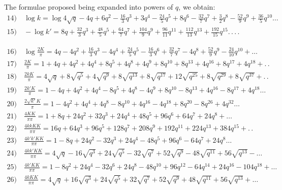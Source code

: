 \documentclass{article}
\begin{document}
The formulae proposed being expanded into powers of $q$, we obtain:
\[
\begin{gathered}
\text{14)}\quad\log k=\log4\sqrt{q}-4q+6q^{2}-\frac{16}{3}q^{3}+3q^{4}-\frac{24}{5}q^{5}+8q^{6}-\frac{32}{7}q^{7}+\frac{3}{2}q^{8}-\frac{52}{9}q^{9}+\frac{36}{5}q^{10}\ldots\\[2ex]
\text{15)}\quad-\log k'=8q+\frac{32}{3}q^{3}+\frac{48}{5}q^{5}+\frac{64}{7}q^{7}+\frac{104}{9}q^{9}+\frac{96}{11}q^{11}+\frac{112}{13}q^{13}+\frac{192}{15}q^{15}.\,.\,.\,.
\end{gathered}
\]

\[
\begin{gathered}
\text{16)}\quad\log\frac{2K}{\pi}=4q-4q^{2}+\frac{16}{3}q^{3}-4q^{4}+\frac{24}{5}q^{5}-\frac{16}{3}q^{6}+\frac{32}{7}q^{7}-4q^{8}+\frac{52}{9}q^{9}-\frac{24}{10}q^{10}+\ldots\\[2ex]
\text{17)}\quad\frac{2K}{\pi}=1+4q+4q^{2}+4q^{4}+8q^{5}+4q^{8}+4q^{9}+8q^{10}+8q^{13}+4q^{16}+8q^{17}+4q^{18}+.\,.\\[2ex]
\text{18)}\quad\frac{2kK}{\pi}=4\sqrt{q}+8\sqrt{q^{5}}+4\sqrt{q^{9}}+8\sqrt{q^{13}}+8\sqrt{q^{17}}+12\sqrt{q^{25}}+8\sqrt{q^{29}}+8\sqrt{q^{37}}+.\,.\\[2ex]
\text{19)}\quad\frac{2k'K}{\pi}=1-4q+4q^{2}+4q^{4}-8q^{5}+4q^{8}-4q^{9}+8q^{10}-8q^{13}+4q^{16}-8q^{17}+4q^{18}\ldots\\[2ex]
\text{20)}\quad\frac{2\sqrt{k'}K}{\pi}=1-4q^{2}+4q^{4}+4q^{8}-8q^{10}+4q^{16}-4q^{18}+8q^{20}-8q^{26}+4q^{32}\ldots\\[2ex]
\text{21)}\quad\frac{4KK}{\pi\pi}=1+8q+24q^{2}+32q^{3}+24q^{4}+48q^{5}+96q^{6}+64q^{7}+24q^{8}+\ldots\\[2ex]
\text{22)}\quad\frac{4kkKK}{\pi\pi}=16q+64q^{3}+96q^{5}+128q^{7}+208q^{9}+192q^{11}+224q^{13}+384q^{15}+.\,.\\[2ex]
\text{23)}\quad\frac{4k'k'KK}{\pi\pi}=1-8q+24q^{2}-32q^{3}+24q^{4}-48q^{5}+96q^{6}-64q^{7}+24q^{8}\ldots\\[2ex]
\text{24)}\quad\frac{4kk'KK}{\pi\pi}=4\sqrt{q}-16\sqrt{q^{3}}+24\sqrt{q^{5}}-32\sqrt{q^{7}}+52\sqrt{q^{9}}-48\sqrt{q^{11}}+56\sqrt{q^{13}}-\ldots\\[2ex]
\text{25)}\quad\frac{4k'KK}{\pi\pi}=1-8q^{2}+24q^{4}-32q^{6}+24q^{8}-48q^{10}+96q^{12}-64q^{14}+24q^{16}-104q^{18}+\ldots\\[2ex]
\text{26)}\quad\frac{4kKK}{\pi\pi}=4\sqrt{q}+16\sqrt{q^{3}}+24\sqrt{q^{5}}+32\sqrt{q^{7}}+52\sqrt{q^{9}}+48\sqrt{q^{11}}+56\sqrt{q^{13}}+\ldots
\end{gathered}
\]
\end{document}
